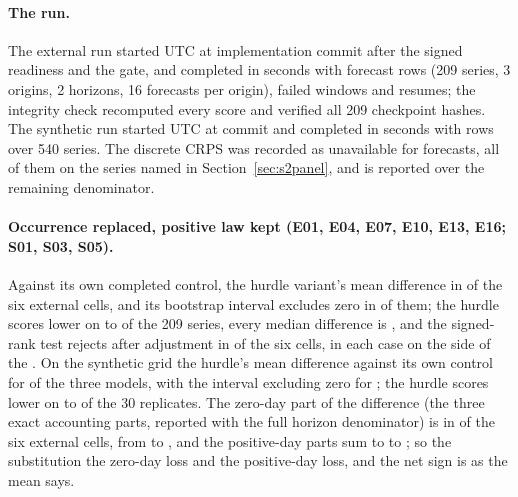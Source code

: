 \paragraph{The run.} The external run started \tbd{} UTC at implementation commit \texttt{\tbd{}} after the
signed readiness and the gate, and completed in \tbd{} seconds with \tbd{} forecast rows (209 series, 3
origins, 2 horizons, 16 forecasts per origin), \tbd{} failed windows and \tbd{} resumes; the integrity
check recomputed every score and verified all 209 checkpoint hashes. The synthetic run started \tbd{} UTC at
commit \texttt{\tbd{}} and completed in \tbd{} seconds with \tbd{} rows over 540 series. The discrete CRPS
was recorded as unavailable for \tbd{} forecasts, all of them on the series named in
Section~\ref{sec:s2panel}, and is reported over the remaining denominator.

\paragraph{Occurrence replaced, positive law kept (E01, E04, E07, E10, E13, E16; S01, S03, S05).} Against its
own completed control, the hurdle variant's mean difference  in
\tbd{} of the six external cells, and its bootstrap interval excludes zero in \tbd{} of them; the hurdle
scores lower on \tbd{} to \tbd{} of the 209 series, every median difference is ,
and the signed-rank test rejects after adjustment in \tbd{} of the six cells, in each case on the side of
the . On the synthetic grid the hurdle's mean difference against its own control
 for \tbd{} of the three models, with the interval excluding
zero for \tbd{}; the hurdle scores lower on \tbd{} to \tbd{} of the 30 replicates. The zero-day part of the
difference (the three exact accounting parts, reported with the full horizon denominator) is
 in \tbd{} of the six external cells, from \tbd{} to \tbd{}, and the positive-day
parts sum to \tbd{} to \tbd{}; so the substitution  the zero-day loss and  the positive-day loss, and the net sign is as the mean says.

